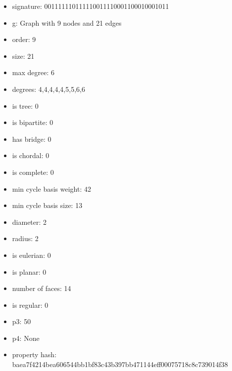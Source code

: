 \newpage
\begin{figure}
\end{figure}
\begin{itemize}
\item signature: 001111110111110011110001100010001011
\item g: Graph with 9 nodes and 21 edges
\item order: 9
\item size: 21
\item max degree: 6
\item degrees: 4,4,4,4,4,5,5,6,6
\item is tree: 0
\item is bipartite: 0
\item has bridge: 0
\item is chordal: 0
\item is complete: 0
\item min cycle basis weight: 42
\item min cycle basis size: 13
\item diameter: 2
\item radius: 2
\item is eulerian: 0
\item is planar: 0
\item number of faces: 14
\item is regular: 0
\item p3: 50
\item p4: None
\item property hash: baea7f4214bea606544bb1bf83c43b397bb471144eff00075718c8c739014f38
\end{itemize}
